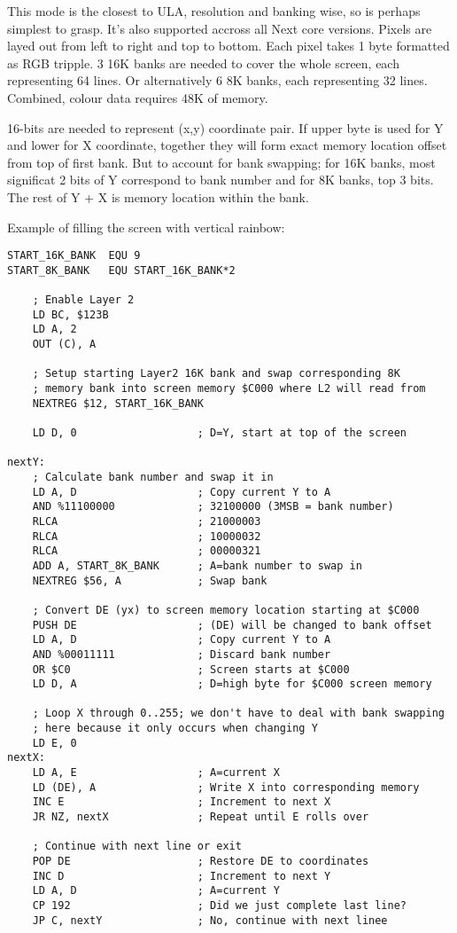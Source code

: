\documentclass[12pt,twoside,openright,a4paper]{book}
\begin{document}
This mode is the closest to ULA, resolution and banking wise, so is perhaps simplest to grasp. It's also supported accross all Next core versions. Pixels are layed out from left to right and top to bottom. Each pixel takes 1 byte formatted as RGB tripple. 3 16K banks are needed to cover the whole screen, each representing 64 lines. Or alternatively 6 8K banks, each representing 32 lines. Combined, colour data requires 48K of memory.

16-bits are needed to represent (x,y) coordinate pair. If upper byte is used for Y and lower for X coordinate, together they will form exact memory location offset from top of first bank. But to account for bank swapping; for 16K banks, most significat 2 bits of Y correspond to bank number and for 8K banks, top 3 bits. The rest of Y + X is memory location within the bank.

Example of filling the screen with vertical rainbow:

\begin{Verbatim}
START_16K_BANK  EQU 9
START_8K_BANK   EQU START_16K_BANK*2

	; Enable Layer 2
	LD BC, $123B
	LD A, 2
	OUT (C), A
    
    ; Setup starting Layer2 16K bank and swap corresponding 8K
    ; memory bank into screen memory $C000 where L2 will read from
    NEXTREG $12, START_16K_BANK
    
    LD D, 0                   ; D=Y, start at top of the screen
    
nextY:
    ; Calculate bank number and swap it in
    LD A, D                   ; Copy current Y to A
    AND %11100000             ; 32100000 (3MSB = bank number)
    RLCA                      ; 21000003
    RLCA                      ; 10000032
    RLCA                      ; 00000321
    ADD A, START_8K_BANK      ; A=bank number to swap in
    NEXTREG $56, A            ; Swap bank
    
    ; Convert DE (yx) to screen memory location starting at $C000
    PUSH DE                   ; (DE) will be changed to bank offset
    LD A, D                   ; Copy current Y to A
    AND %00011111             ; Discard bank number
    OR $C0                    ; Screen starts at $C000
    LD D, A                   ; D=high byte for $C000 screen memory

    ; Loop X through 0..255; we don't have to deal with bank swapping
    ; here because it only occurs when changing Y
    LD E, 0
nextX:
    LD A, E                   ; A=current X
    LD (DE), A                ; Write X into corresponding memory
    INC E                     ; Increment to next X
    JR NZ, nextX              ; Repeat until E rolls over
    
    ; Continue with next line or exit
    POP DE                    ; Restore DE to coordinates
    INC D                     ; Increment to next Y
    LD A, D                   ; A=current Y
    CP 192                    ; Did we just complete last line?
    JP C, nextY               ; No, continue with next linee
\end{Verbatim}
\end{document}
